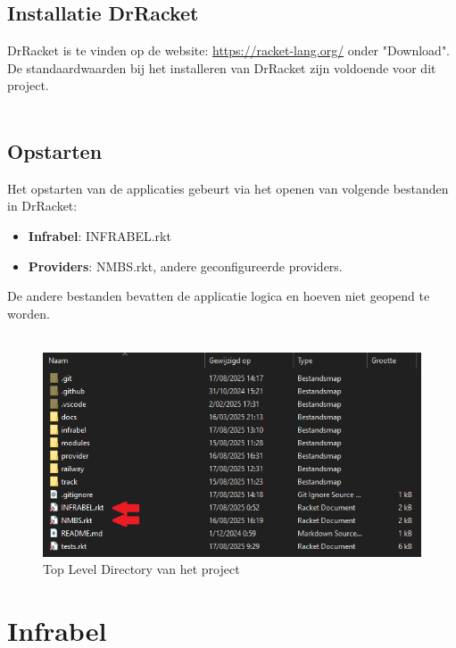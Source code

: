 \documentclass[a4paper, 11pt]{article}
\newcommand{\<}{\scriptsize\textless\normalsize}
\renewcommand{\>}{\scriptsize\textgreater\normalsize}
\begin{document}
\subsection{Installatie DrRacket} %
DrRacket is te vinden op de website: \url{https://racket-lang.org/} onder "Download". De standaardwaarden bij het installeren van DrRacket zijn voldoende voor dit project.\\\\

\subsection{Opstarten} %
Het opstarten van de applicaties gebeurt via het openen van volgende bestanden in DrRacket:
\begin{itemize}
  \item \textbf{Infrabel}: INFRABEL.rkt
  \item \textbf{Providers}: NMBS.rkt, andere geconfigureerde providers.
\end{itemize}
De andere bestanden bevatten de applicatie logica en hoeven niet geopend te worden.\\\\
\begin{figure}[h]
	\begin{center}
		\includegraphics[scale=.5]{Bestanden/besturingssysteem-modeltreinen-tldir.png}
		\caption{Top Level Directory van het project}
	\end{center}
\end{figure}

\newpage
\section{Infrabel} %
\end{document}
